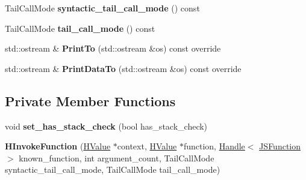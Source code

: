 \begin{DoxyCompactItemize}
\item 
Tail\+Call\+Mode {\bfseries syntactic\+\_\+tail\+\_\+call\+\_\+mode} () const \hypertarget{classv8_1_1internal_1_1_h_invoke_function_a862c5ffe350f1d8bf267105828956862}{}\label{classv8_1_1internal_1_1_h_invoke_function_a862c5ffe350f1d8bf267105828956862}

\item 
Tail\+Call\+Mode {\bfseries tail\+\_\+call\+\_\+mode} () const \hypertarget{classv8_1_1internal_1_1_h_invoke_function_ae41aa2c00194439dd0b12bdb030c81a6}{}\label{classv8_1_1internal_1_1_h_invoke_function_ae41aa2c00194439dd0b12bdb030c81a6}

\item 
std\+::ostream \& {\bfseries Print\+To} (std\+::ostream \&os) const  override\hypertarget{classv8_1_1internal_1_1_h_invoke_function_af7bc639dec4ef7f18ac435f90e6df35c}{}\label{classv8_1_1internal_1_1_h_invoke_function_af7bc639dec4ef7f18ac435f90e6df35c}

\item 
std\+::ostream \& {\bfseries Print\+Data\+To} (std\+::ostream \&os) const  override\hypertarget{classv8_1_1internal_1_1_h_invoke_function_a0794650f4bf0e77d8f7bed7336c6ca44}{}\label{classv8_1_1internal_1_1_h_invoke_function_a0794650f4bf0e77d8f7bed7336c6ca44}

\end{DoxyCompactItemize}
\subsection*{Private Member Functions}
\begin{DoxyCompactItemize}
\item 
void {\bfseries set\+\_\+has\+\_\+stack\+\_\+check} (bool has\+\_\+stack\+\_\+check)\hypertarget{classv8_1_1internal_1_1_h_invoke_function_a2101ee36c4ae2d14482517a75a95782c}{}\label{classv8_1_1internal_1_1_h_invoke_function_a2101ee36c4ae2d14482517a75a95782c}

\item 
{\bfseries H\+Invoke\+Function} (\hyperlink{classv8_1_1internal_1_1_h_value}{H\+Value} $\ast$context, \hyperlink{classv8_1_1internal_1_1_h_value}{H\+Value} $\ast$function, \hyperlink{classv8_1_1internal_1_1_handle}{Handle}$<$ \hyperlink{classv8_1_1internal_1_1_j_s_function}{J\+S\+Function} $>$ known\+\_\+function, int argument\+\_\+count, Tail\+Call\+Mode syntactic\+\_\+tail\+\_\+call\+\_\+mode, Tail\+Call\+Mode tail\+\_\+call\+\_\+mode)\hypertarget{classv8_1_1internal_1_1_h_invoke_function_ab26e3c5112c2b6c3ad6dbcf9f55c6eac}{}\label{classv8_1_1internal_1_1_h_invoke_function_ab26e3c5112c2b6c3ad6dbcf9f55c6eac}

\end{DoxyCompactItemize}
